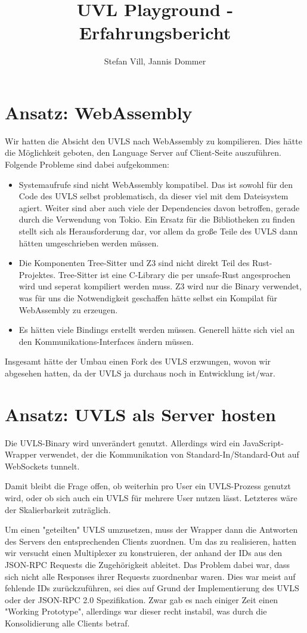\documentclass{article}
\title{UVL Playground - Erfahrungsbericht}
\author{Stefan Vill, Jannis Dommer}
\begin{document}
\maketitle

\section{Ansatz: WebAssembly}
Wir hatten die Absicht den UVLS nach WebAssembly zu kompilieren.
Dies hätte die Möglichkeit geboten, den Language Server auf Client-Seite auszuführen.
Folgende Probleme sind dabei aufgekommen:

\begin{itemize}
    \item Systemaufrufe sind nicht WebAssembly kompatibel. Das ist sowohl für den Code des UVLS selbst problematisch, da dieser viel mit dem Dateisystem agiert. Weiter sind aber auch viele der Dependencies davon betroffen, gerade durch die Verwendung von Tokio. Ein Ersatz für die Bibliotheken zu finden stellt sich als Herausforderung dar, vor allem da große Teile des UVLS dann hätten umgeschrieben werden müssen.
    \item Die Komponenten Tree-Sitter und Z3 sind nicht direkt Teil des Rust-Projektes. Tree-Sitter ist eine C-Library die per unsafe-Rust angesprochen wird und seperat kompiliert werden muss. Z3 wird nur die Binary verwendet, was für uns die Notwendigkeit geschaffen hätte selbst ein Kompilat für WebAssembly zu erzeugen. 
    \item Es hätten viele Bindings erstellt werden müssen. Generell hätte sich viel an den Kommunikations-Interfaces ändern müssen.
\end{itemize}

Insgesamt hätte der Umbau einen Fork des UVLS erzwungen, wovon wir abgesehen hatten, da der UVLS ja durchaus noch in Entwicklung ist/war.

\section{Ansatz: UVLS als Server hosten}
Die UVLS-Binary wird unverändert genutzt. 
Allerdings wird ein JavaScript-Wrapper verwendet, der die Kommunikation von Standard-In/Standard-Out auf WebSockets tunnelt.

Damit bleibt die Frage offen, ob weiterhin pro User ein UVLS-Prozess genutzt wird, oder ob sich auch ein UVLS für mehrere User nutzen lässt. Letzteres wäre der Skalierbarkeit zuträglich.

Um einen "geteilten" UVLS umzusetzen, muss der Wrapper dann die Antworten des Servers den entsprechenden Clients zuordnen.
Um das zu realisieren, hatten wir versucht einen Multiplexer zu konstruieren, der anhand der IDs aus den JSON-RPC Requests die Zugehörigkeit ableitet.
Das Problem dabei war, dass sich nicht alle Responses ihrer Requests zuordnenbar waren.
Dies war meist auf fehlende IDs zurückzuführen, sei dies auf Grund der Implementierung des UVLS oder der JSON-RPC 2.0 Spezifikation.
Zwar gab es nach einiger Zeit einen "Working Prototype", allerdings war dieser recht instabil, was durch die Konsolidierung alle Clients betraf.
\end{document}
